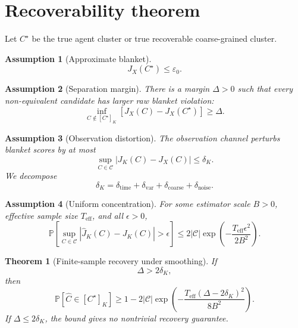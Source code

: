 \documentclass[10pt]{article}
\newtheorem{assumption}{Assumption}
\newtheorem{theorem}{Theorem}
\newcommand{\Prob}{\mathbb{P}}
\newcommand{\cC}{\mathcal{C}}
\newcommand{\eff}{\mathrm{eff}}
\begin{document}
\section{Recoverability theorem}

Let \(C^\star\) be the true agent cluster or true recoverable coarse-grained cluster.

\begin{assumption}[Approximate blanket]
\[
J_X(C^\star)\le \varepsilon_0.
\]
\end{assumption}

\begin{assumption}[Separation margin]
There is a margin \(\Delta>0\) such that every non-equivalent candidate has larger raw blanket violation:
\begin{equation}
\inf_{C\notin[C^\star]_K}
\left[J_X(C)-J_X(C^\star)\right]
\ge \Delta.
\label{eq:margin}
\end{equation}
\end{assumption}

\begin{assumption}[Observation distortion]
The observation channel perturbs blanket scores by at most
\begin{equation}
\sup_{C\in\cC}|J_K(C)-J_X(C)|\le \delta_K.
\label{eq:distortion}
\end{equation}
We decompose
\[
\delta_K
=
\delta_{\mathrm{time}}
+
\delta_{\mathrm{var}}
+
\delta_{\mathrm{coarse}}
+
\delta_{\mathrm{noise}}.
\]
\end{assumption}

\begin{assumption}[Uniform concentration]
For some estimator scale \(B>0\), effective sample size \(T_{\eff}\), and all \(\epsilon>0\),
\begin{equation}
\Prob\!\left[
\sup_{C\in\cC}|\hat J_K(C)-J_K(C)|>\epsilon
\right]
\le
2|\cC|\exp\!\left(-\frac{T_{\eff}\epsilon^2}{2B^2}\right).
\label{eq:concentration}
\end{equation}
\end{assumption}

\begin{theorem}[Finite-sample recovery under smoothing]
If
\[
\Delta>2\delta_K,
\]
then
\begin{equation}
\Prob[\hat C\in[C^\star]_K]
\ge
1-
2|\cC|
\exp\!\left(
-\frac{T_{\eff}(\Delta-2\delta_K)^2}{8B^2}
\right).
\label{eq:main_bound}
\end{equation}
If \(\Delta\le 2\delta_K\), the bound gives no nontrivial recovery guarantee.
\end{theorem}
\end{document}
